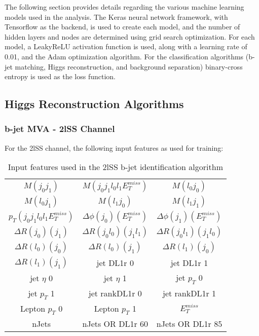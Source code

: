 
The following section provides details regarding the various machine learning models used in the analysis. The Keras neural network framework, with Tensorflow as the backend, is used to create each model, and the number of hidden layers and nodes are determined using grid search optimization. For each model, a LeakyReLU activation function is used, along with a learning rate of 0.01, and the Adam optimization algorithm. For the classification algorithms (b-jet matching, Higgs reconstruction, and background separation) binary-cross entropy is used as the loss function. 

\subsection{Higgs Reconstruction Algorithms}
\label{subsec:higgsRecoMVA}

\subsubsection{b-jet MVA - 2lSS Channel}
\label{subsec:top2lSS}
                                                                                                                     
For the 2lSS channel, the following input features as used for training:

\begin{table}[h!]
  \begin{tabular}{ccc}
    $M(j_0j_1)$ & $M(j_0j_1l_0l_1E_T^{miss})$ & $M(l_0j_0)$ \\
    $M(l_0j_1)$ & $M(l_1j_0)$ & $M(l_1j_1)$ \\
    $p_T(j_0j_1l_0l_1E_T^{miss})$ & $\Delta\phi(j_0)(E_T^{miss})$ & $\Delta\phi(j_1)(E_T^{miss})$ \\
    $\Delta R(j_0)(j_1)$ & $\Delta R(j_0l_0)(j_1l_1)$ & $\Delta R(j_0l_1)(j_1l_0)$ \\
    $\Delta R(l_0)(j_0)$ & $\Delta R(l_0)(j_1)$ & $\Delta R(l_1)(j_0)$ \\
    $\Delta R(l_1)(j_1)$ & jet DL1r 0 & jet DL1r 1 \\
    jet  $\eta$ 0 & jet  $\eta$ 1 & jet  $p_T$ 0 \\
    jet  $p_T$ 1 & jet rankDL1r 0 & jet rankDL1r 1 \\
    Lepton  $p_T$ 0 & Lepton  $p_T$ 1 & $E_T^{miss}$ \\
    nJets & nJets OR DL1r 60 & nJets OR DL1r 85\\
  \end{tabular}
  \caption{Input features used in the 2lSS b-jet identification algorithm}
  \label{tab:top2lSSfeatures}   
\end{table}

